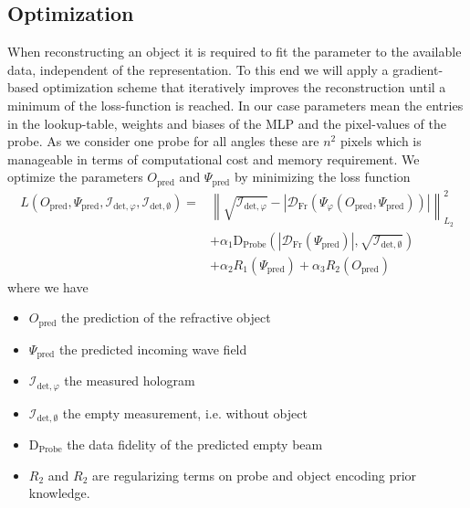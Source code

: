 \subsection{Optimization} \label{subsec:Optimization}
When reconstructing an object it is required to fit the parameter to the available data, independent of the representation.
To this end we will apply a gradient-based optimization scheme that iteratively improves the reconstruction until a minimum of the loss-function is reached.
In our case parameters mean the entries in the lookup-table, weights and biases of the MLP and the pixel-values of the probe.
As we consider one probe for all angles these are \( n^2 \) pixels which is manageable in terms of computational cost and memory requirement.
We optimize the parameters \( O_\mathrm{pred} \) and \( \Psi_\mathrm{pred} \) by minimizing the loss function
\begin{equation}
  \begin{aligned}
   L(O_\mathrm{pred}, \Psi_\mathrm{pred}, \mathcal{I}_{\mathrm{det}, \varphi}, \mathcal{I}_{\mathrm{det}, \emptyset}) =  & \left\| 
   \sqrt{\mathcal{I}_{\mathrm{det}, \varphi}} 
   - \left|  \mathcal{D}_\mathrm{Fr}\left( \Psi_\varphi \left( O_\mathrm{pred}, \Psi_\mathrm{pred} \right) \right) \right|  \right\|_{L_{2}}^2 \\ 
   & + \alpha_{1} \mathrm{D}_\mathrm{Probe} \left( \left| \mathcal{D}_\mathrm{Fr}\left( \Psi_\mathrm{pred} \right) \right| , \sqrt{ \mathcal{I}_{\mathrm{det}, \emptyset } }  \right) \\ 
   & +  \alpha_{2} R_{1}(\Psi_\mathrm{pred}) + \alpha_{3} R_{2}(O_\mathrm{pred}) 
  \end{aligned}
  \label{eq:loss_fct}
\end{equation}
where we have 
\begin{itemize}
  \item \( O_\mathrm{pred} \) the prediction of the refractive object
  \item \( \Psi_\mathrm{pred} \) the predicted incoming wave field
  \item \( \mathcal{I}_{\mathrm{det}, \varphi} \) the measured hologram
  \item \( \mathcal{I}_{\mathrm{det}, \emptyset} \) the empty measurement, i.e.
  without object
\item \( \mathrm{D}_\mathrm{Probe} \) the data fidelity of the predicted empty beam
  \item \( R_{2} \) and \(  R_{2} \) are regularizing terms on probe and object encoding prior knowledge.
\end{itemize}
